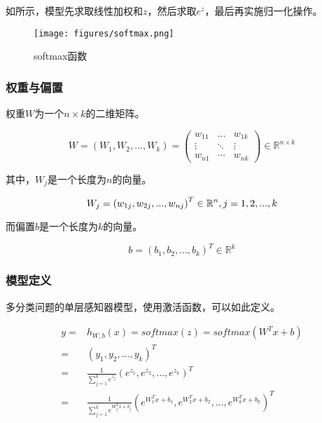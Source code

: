\begin{content}
如所示，模型先求取线性加权和$z$，然后求取$e^z$，最后再实施归一化操作。

\begin{figure}[H]
\centering
\texttt{[image: figures/softmax.png]}
\caption{softmax函数}
 \label{fig:softmax}
\end{figure}

\subsubsection{权重与偏置}

权重$W$为一个$n \times k$的二维矩阵。

\[
W = \left( {{W_1},{W_2},...,{W_k}} \right) = \left( {\begin{array}{*{20}{c}}
  {{w_{11}}}& \ldots &{{w_{1k}}} \\ 
   \vdots & \ddots & \vdots  \\ 
  {{w_{n1}}}& \cdots &{{w_{nk}}} 
\end{array}} \right) \in {\mathbb{R}^{n \times k}}
\]

其中，$W_j$是一个长度为$n$的向量。

\[
{W_j} = {\left( {{w_{1j}},{w_{2j}},...,{w_{nj}}} \right)^T} \in {\mathbb{R}^n}, j = 1,2,...,k \\
\]

而偏置$b$是一个长度为$k$的向量。

\[
b = {({b_1},{b_2},...,{b_k})^T} \in {\mathbb{R}^k}
\]

\subsubsection{模型定义}

多分类问题的单层感知器模型，使用激活函数，可以如此定义。

\[\begin{aligned}
  y =  & {h_{W,b}}(x) = softmax (z) = softmax ({W^T}x + b) \\ 
   =  & {\left( {{y_1},{y_2},...,{y_k}} \right)^T} \\ 
   =  & \frac{1}{{\sum\limits_{j = 1}^k {{e^{{z_j}}}} }}{\left( {{e^{{z_1}}},{e^{{z_2}}},...,{e^{{z_k}}}} \right)^T} \\ 
   =  & \frac{1}{{\sum\limits_{j = 1}^k {{e^{W_j^Tx + {b_j}}}} }}{\left( {{e^{W_1^Tx + {b_1}}},{e^{W_2^Tx + {b_2}}},...,{e^{W_k^Tx + {b_k}}}} \right)^T} \ 
\end{aligned} \]


\end{content}
